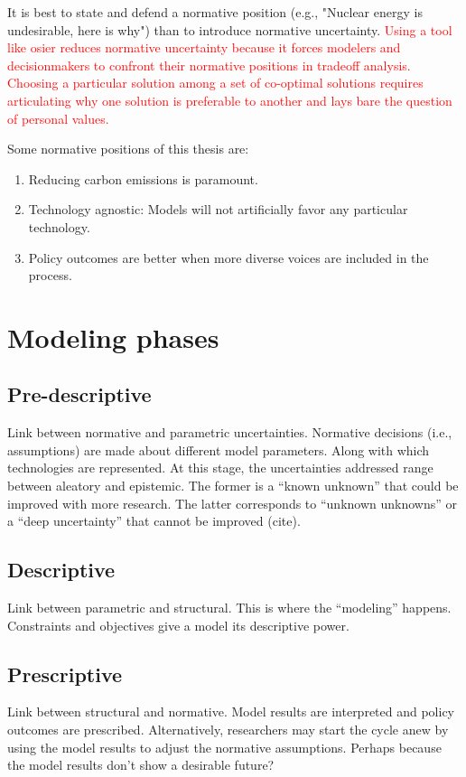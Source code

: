 It is best to state and defend a normative position (e.g., "Nuclear energy is
undesirable, here is why") than to introduce normative uncertainty.
\textcolor{red}{Using a tool like \ac{osier} reduces normative uncertainty
because it forces modelers and decisionmakers to confront their normative
positions in tradeoff analysis. Choosing a particular solution among a set of
co-optimal solutions requires articulating why one solution is preferable to
another and lays bare the question of personal values.}

Some normative positions of this thesis are:
\begin{enumerate}
    \item Reducing carbon emissions is paramount.
    \item Technology agnostic: Models will not artificially favor any particular technology.
    \item Policy outcomes are better when more diverse voices are included in the process.
\end{enumerate}

\section{Modeling phases}

\subsection{Pre-descriptive}

Link between normative and parametric uncertainties. Normative decisions (i.e., assumptions)
are made about different model parameters. Along with which technologies are represented.
At this stage, the uncertainties addressed range between aleatory and epistemic. The former 
is a ``known unknown'' that could be improved with more research. The latter corresponds to 
``unknown unknowns'' or a ``deep uncertainty'' that cannot be improved (cite).

\subsection{Descriptive}
Link between parametric and structural. This is where the ``modeling'' happens. Constraints
and objectives give a model its descriptive power.

\subsection{Prescriptive}
Link between structural and normative. Model results are interpreted and policy outcomes
are prescribed. Alternatively, researchers may start the cycle anew by using the model
results to adjust the normative assumptions. Perhaps because the model results don't show
a desirable future?